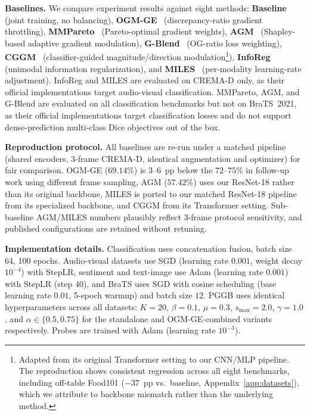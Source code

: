 \documentclass{article}
\begin{document}
\textbf{Baselines.}
\label{sec:baselines}
We compare experiment results against eight methods: \textbf{Baseline} (joint training, no balancing), \textbf{OGM-GE}~\citep{peng2022ogmge} (discrepancy-ratio gradient throttling), \textbf{MMPareto}~\citep{wei2024mmpareto} (Pareto-optimal gradient weights), \textbf{AGM}~\citep{li2023agm} (Shapley-based adaptive gradient modulation), \textbf{G-Blend}~\citep{wang2020gblending} (OG-ratio loss weighting), \textbf{CGGM}~\citep{guo2024cggm} (classifier-guided magnitude/direction modulation\footnote{Adapted from its original Transformer setting to our CNN/MLP pipeline. The reproduction shows consistent regression across all eight benchmarks, including off-table Food101 ($-37$~pp vs.\ baseline, Appendix~\ref{app:datasets}), which we attribute to backbone mismatch rather than the underlying method.}), \textbf{InfoReg}~\citep{huang2025inforeg} (unimodal information regularization), and \textbf{MILES}~\citep{guerra2025miles} (per-modality learning-rate adjustment). InfoReg and MILES are evaluated on CREMA-D only, as their official implementations target audio-visual classification. MMPareto, AGM, and G-Blend are evaluated on all classification benchmarks but not on BraTS~2021, as their official implementations target classification losses and do not support dense-prediction multi-class Dice objectives out of the box.

\textbf{Reproduction protocol.} All baselines are re-run under a matched pipeline (shared encoders, 3-frame CREMA-D, identical augmentation and optimizer) for fair comparison. OGM-GE ($69.14\%$) is $3$--$6$~pp below the $72$--$75\%$ in follow-up work using different frame sampling, AGM ($57.42\%$) uses our ResNet-18 rather than its original backbone, MILES is ported to our matched ResNet-18 pipeline from its specialized backbone, and CGGM from its Transformer setting. Sub-baseline AGM/MILES numbers plausibly reflect 3-frame protocol sensitivity, and published configurations are retained without retuning.

\textbf{Implementation details.}
Classification uses concatenation fusion, batch size 64, 100 epochs. Audio-visual datasets use SGD (learning rate $0.001$, weight decay $10^{-4}$) with StepLR, sentiment and text-image use Adam (learning rate $0.001$) with StepLR (step $40$), and BraTS uses SGD with cosine scheduling (base learning rate $0.01$, 5-epoch warmup) and batch size $12$. PGGB uses identical hyperparameters across all datasets: $K{=}20$, $\beta{=}0.1$, $\mu{=}0.3$, $s_{\max}{=}2.0$, $\gamma{=}1.0$, and $\alpha \in \{0.5, 0.75\}$ for the standalone and OGM-GE-combined variants respectively. Probes are trained with Adam (learning rate $10^{-3}$).
\end{document}
